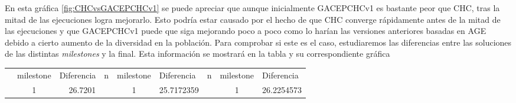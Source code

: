 En esta gráfica \ref{fig:CHCvsGACEPCHCv1} se puede apreciar que aunque inicialmente GACEPCHCv1 es bastante peor que CHC, tras la mitad de las ejecuciones logra mejorarlo. 
Esto podría estar causado por el hecho de que CHC converge rápidamente antes de la mitad de las ejecuciones y que GACEPCHCv1 puede que siga mejorando poco a poco como lo harían las versiones anteriores basadas en AGE debido a cierto aumento de la diversidad en la población. 
Para comprobar si este es el caso, estudiaremos las diferencias entre las soluciones de las distintas \textit{milestones} y la final. 
Esta información se mostrará en la tabla y su correspondiente gráfica

\begin{table}[h]
\begin{tabular}{|ccrccrccr|}
\hline
\rowcolor[HTML]{FFFFC7} 
\multicolumn{9}{|c|}{\cellcolor[HTML]{FFFFC7}GACEPCHCv1}                                                                                                                                                                                                                                                                                                                                                                                                                                                                                                                                             \\ \hline
\rowcolor[HTML]{F7EAC7} 
\multicolumn{1}{|c|}{\cellcolor[HTML]{F7EAC7}n}                               & \multicolumn{1}{c|}{\cellcolor[HTML]{F7EAC7}milestone} & \multicolumn{1}{l|}{\cellcolor[HTML]{F7EAC7}Diferencia} & \multicolumn{1}{c|}{\cellcolor[HTML]{F7EAC7}n}                               & \multicolumn{1}{c|}{\cellcolor[HTML]{F7EAC7}milestone} & \multicolumn{1}{l|}{\cellcolor[HTML]{F7EAC7}Diferencia} & \multicolumn{1}{c|}{\cellcolor[HTML]{F7EAC7}n}                               & \multicolumn{1}{c|}{\cellcolor[HTML]{F7EAC7}milestone} & \multicolumn{1}{l|}{\cellcolor[HTML]{F7EAC7}Diferencia} \\ \hline
\rowcolor[HTML]{DAE8FC} 
\multicolumn{1}{|c|}{\cellcolor[HTML]{FFFFC7}}                                & \multicolumn{1}{c|}{\cellcolor[HTML]{DAE8FC}1}         & \multicolumn{1}{r|}{\cellcolor[HTML]{DAE8FC}26.7201}    & \multicolumn{1}{c|}{\cellcolor[HTML]{FFFFC7}}                                & \multicolumn{1}{c|}{\cellcolor[HTML]{DAE8FC}1}         & \multicolumn{1}{r|}{\cellcolor[HTML]{DAE8FC}25.7172359} & \multicolumn{1}{c|}{\cellcolor[HTML]{FFFFC7}}                                & \multicolumn{1}{c|}{\cellcolor[HTML]{DAE8FC}1}         & 26.2254573                                              \\ \cline{2-3} \cline{5-6} \cline{8-9} 

\end{tabular}
\end{table}
